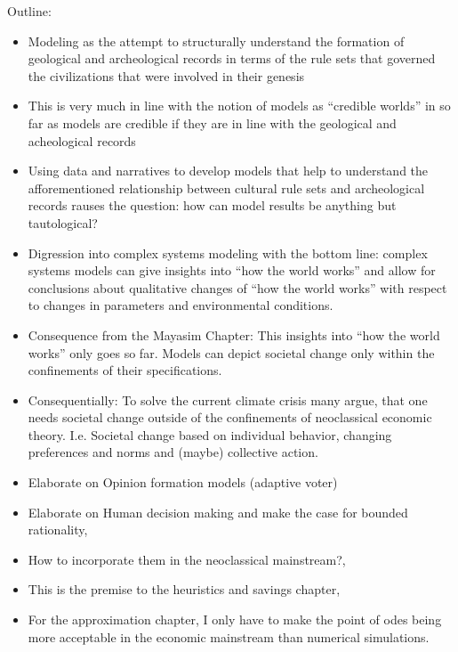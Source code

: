 Outline:
\begin{itemize}
  \item Modeling as the attempt to structurally understand the formation of geological and archeological records in terms of the rule sets that governed the civilizations that were involved in their genesis
  \item This is very much in line with the notion of models as ``credible worlds'' in so far as models are credible if they are in line with the geological and acheological records
  \item Using data and narratives to develop models that help to understand the afforementioned relationship between cultural rule sets and archeological records rauses the question: how can model results be anything but tautological?
  \item Digression into complex systems modeling with the bottom line: complex systems models can give insights into ``how the world works'' and allow for conclusions about qualitative changes of ``how the world works'' with respect to changes in parameters and environmental conditions.
  \item Consequence from the Mayasim Chapter: This insights into ``how the world works'' only goes so far. Models can depict societal change only within the confinements of their specifications. 
 \item Consequentially: To solve the current climate crisis many argue, that one needs societal change outside of the confinements of neoclassical economic theory. I.e. Societal change based on individual behavior, changing preferences and norms and (maybe) collective action.
 \item Elaborate on Opinion formation models (adaptive voter)
 \item Elaborate on Human decision making and make the case for bounded rationality,
 \item How to incorporate them in the neoclassical mainstream?,
 \item This is the premise to the heuristics and savings chapter,
 \item For the approximation chapter, I only have to make the point of odes being more acceptable in the economic mainstream than numerical simulations.
\end{itemize}
















